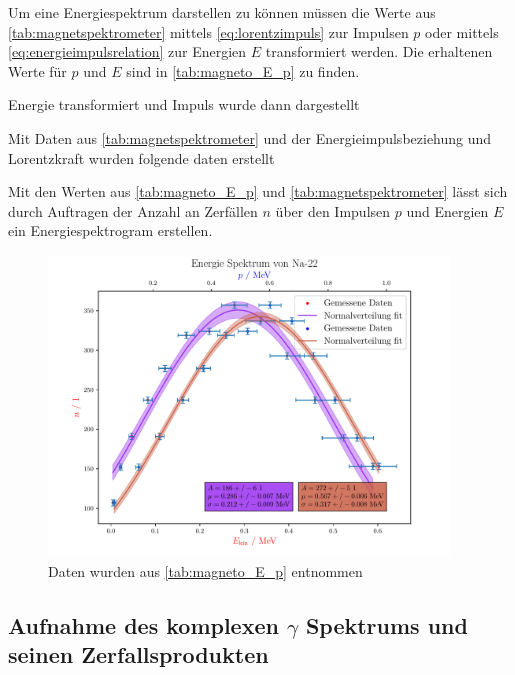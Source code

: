 \documentclass[12pt,english,ngerman]{scrartcl}
\begin{document}
Um eine Energiespektrum darstellen zu können müssen die Werte aus
\autoref{tab:magnetspektrometer} mittels \autoref{eq:lorentzimpuls} zur
Impulsen $p$ oder mittels \autoref{eq:energieimpulsrelation} zur Energien $E$
transformiert werden. Die erhaltenen Werte für $p$ und $E$ sind in
\autoref{tab:magneto_E_p} zu finden.

Energie transformiert und Impuls wurde dann dargestellt
\begin{table}[H]
  \caption{Mit Daten aus \autoref{tab:magnetspektrometer} und der
  Energieimpulsbeziehung und Lorentzkraft wurden folgende daten erstellt}
  \label{tab:magneto_E_p}
  \centering
  
\end{table}

Mit den Werten aus \autoref{tab:magneto_E_p} und
\autoref{tab:magnetspektrometer} lässt sich durch Auftragen der Anzahl an
Zerfällen $n$ über den Impulsen $p$ und Energien $E$ ein Energiespektrogram
erstellen.

\begin{figure}[H]
  \begin{center}
    \includegraphics[width = 0.95\textwidth]{figures/energiespektrum.pdf}
  \end{center}
  \caption{Daten wurden aus \autoref{tab:magneto_E_p} entnommen}
  \label{fig:magneto_E_p}
\end{figure}


\subsection{Aufnahme des komplexen \texorpdfstring{$\gamma$}{gamma} Spektrums
und seinen Zerfallsprodukten}
\end{document}
